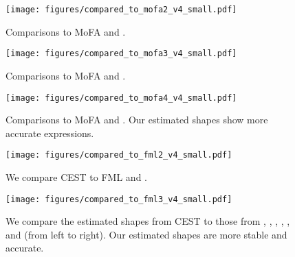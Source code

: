 \begin{appendix}
\begin{figure}[ht]
  \centering
   \setlength{\abovecaptionskip}{2pt}
   \setlength{\belowcaptionskip}{-5pt}
  \renewcommand{\captionlabelfont}{\footnotesize}
  \texttt{[image: figures/compared\_to\_mofa2\_v4\_small.pdf]}
  \caption{\footnotesize Comparisons to MoFA \cite{tewari2017mofa} and \cite{tuan2017regressing}.}\label{fig:mofa2}
  \vspace{-0.1in}
\end{figure}
\begin{figure}[ht]
  \centering
   \setlength{\abovecaptionskip}{2pt}
   \setlength{\belowcaptionskip}{-5pt}
  \renewcommand{\captionlabelfont}{\footnotesize}
  \texttt{[image: figures/compared\_to\_mofa3\_v4\_small.pdf]}
  \caption{\footnotesize Comparisons to MoFA \cite{tewari2017mofa} and \cite{thies2016face2face}.}\label{fig:mofa3}
  \vspace{-0.1in}
\end{figure}
\begin{figure}[ht]
  \centering
   \setlength{\abovecaptionskip}{2pt}
   \setlength{\belowcaptionskip}{-5pt}
  \renewcommand{\captionlabelfont}{\footnotesize}
  \texttt{[image: figures/compared\_to\_mofa4\_v4\_small.pdf]}
  \caption{\footnotesize Comparisons to MoFA \cite{tewari2017mofa} and \cite{richardson2017learning}. Our estimated shapes show more accurate expressions.}\label{fig:mofa4}
  \vspace{-0.1in}
\end{figure}
\begin{figure}[ht]
  \centering
   \setlength{\abovecaptionskip}{2pt}
   \setlength{\belowcaptionskip}{-5pt}
  \renewcommand{\captionlabelfont}{\footnotesize}
  \texttt{[image: figures/compared\_to\_fml2\_v4\_small.pdf]}
  \caption{\footnotesize We compare CEST to FML \cite{tewari2019fml} and \cite{booth20173d}.}\label{fig:fml2}
\end{figure}
\begin{figure}[ht]
  \centering
\renewcommand{\captionlabelfont}{\footnotesize}
  \texttt{[image: figures/compared\_to\_fml3\_v4\_small.pdf]}
  \caption{\footnotesize We compare the estimated shapes from CEST to those from \cite{richardson2017learning}, \cite{sela2017unrestricted}, \cite{tewari2017mofa}, \cite{tewari2019fml}, \cite{sanyal2019learning}, and \cite{shang2020self} (from left to right). Our estimated shapes are more stable and accurate.}\label{fig:fml3}
\end{figure}



\end{appendix}
